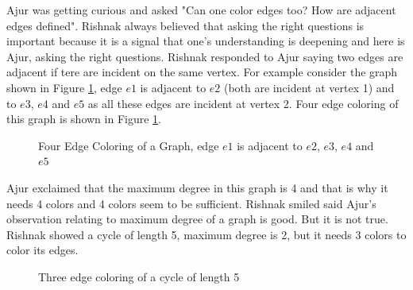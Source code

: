 Ajur was getting curious and asked "Can one color edges too? How are adjacent edges defined".  Rishnak always believed that asking the right questions is important because it is a signal that one's understanding is deepening and here is Ajur, asking the right questions. Rishnak responded to  Ajur saying two edges are adjacent if tere are incident on the same vertex. For example consider the graph shown in Figure \ref{10g5},
edge $e1$ is adjacent to $e2$ (both are incident at vertex 1) and to $e3$, $e4$ and $e5$ as all these edges are incident at vertex 2. Four edge coloring of this graph is shown in Figure \ref{10g5}. 

\begin{figure}
\begin{center}


\caption{Four Edge Coloring of a Graph, edge $e1$ is adjacent to $e2$, $e3$,
$e4$ and $e5$}\label{10g5}
\end{center}
\end{figure}

Ajur exclaimed that the maximum degree in this graph is 4 and that is why it needs 4 colors and 4 colors seem to be sufficient. Rishnak smiled said Ajur's observation relating to maximum degree of a graph is good. But it is not true. Rishnak showed a cycle of length 5, maximum degree is 2, but it needs 3 colors to color its edges.

\begin{figure}
\begin{center}


\caption{Three edge coloring of a cycle of length 5 }\label{10g6}
\end{center}
\end{figure}

